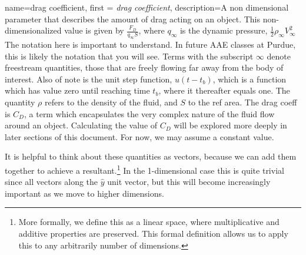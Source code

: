 \documentclass[12pt]{report}
\begin{document}
{
    name=drag coefficient,
    first = \textit{drag coefficient},
    description={A non dimensional parameter that describes the amount of drag acting on an object. This non-dimensionalized value is given by $\frac{F_D}{q_{\infty}S}$, where $q_{\infty}$ is the dynamic pressure, $\frac{1}{2}\rho_{\infty}V_{\infty}^2$}
    }
The notation here is important to understand. In future AAE classes at Purdue, this is likely the notation that you will see. Terms with the subscript $\infty$ denote \gls{freestream} quantities, those that are freely flowing far away from the body of interest. Also of note is the unit step function, $u(t-t_b)$, which is a function which has value zero until reaching time $t_b$, where it thereafter equals one. The quantity  $\rho$ refers to the density of the fluid, and $S$ to the \gls{ref area}. The \gls{drag coeff} is $C_D$, a term which encapsulates the very complex nature of the fluid flow around an object. Calculating the value of $C_D$ will be explored more deeply in later sections of this document. For now, we may assume a constant value.

It is helpful to think about these quantities as vectors, because we can add them together to achieve a resultant.\footnote{More formally, we define this as a linear space, where multiplicative and additive properties are preserved. This formal definition allows us to apply this to any arbitrarily number of dimensions. } In the 1-dimensional case this is quite trivial since all vectors along the $\hat{y}$ unit vector, but this will become increasingly important as we move to higher dimensions.
\end{document}
